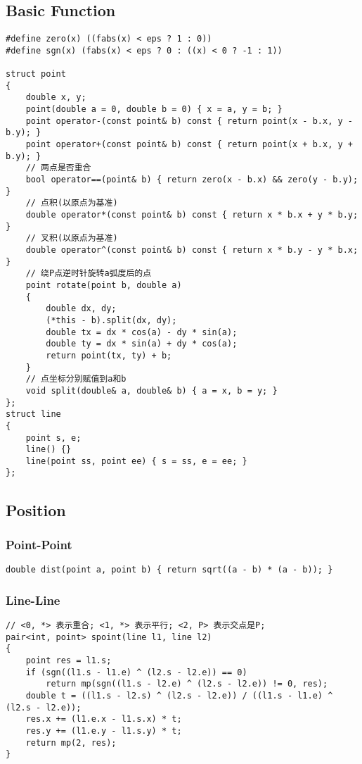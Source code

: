 \documentclass[twoside]{article}
\begin{document}
\subsection{Basic Function}
\begin{lstlisting}
#define zero(x) ((fabs(x) < eps ? 1 : 0))
#define sgn(x) (fabs(x) < eps ? 0 : ((x) < 0 ? -1 : 1))

struct point
{
    double x, y;
    point(double a = 0, double b = 0) { x = a, y = b; }
    point operator-(const point& b) const { return point(x - b.x, y - b.y); }
    point operator+(const point& b) const { return point(x + b.x, y + b.y); }
    // 两点是否重合
    bool operator==(point& b) { return zero(x - b.x) && zero(y - b.y); }
    // 点积(以原点为基准)
    double operator*(const point& b) const { return x * b.x + y * b.y; }
    // 叉积(以原点为基准)
    double operator^(const point& b) const { return x * b.y - y * b.x; }
    // 绕P点逆时针旋转a弧度后的点
    point rotate(point b, double a)
    {
        double dx, dy;
        (*this - b).split(dx, dy);
        double tx = dx * cos(a) - dy * sin(a);
        double ty = dx * sin(a) + dy * cos(a);
        return point(tx, ty) + b;
    }
    // 点坐标分别赋值到a和b
    void split(double& a, double& b) { a = x, b = y; }
};
struct line
{
    point s, e;
    line() {}
    line(point ss, point ee) { s = ss, e = ee; }
};
\end{lstlisting}
\subsection{Position}
\subsubsection{Point-Point}
\begin{lstlisting}
double dist(point a, point b) { return sqrt((a - b) * (a - b)); }
\end{lstlisting}
\subsubsection{Line-Line}
\begin{lstlisting}
// <0, *> 表示重合; <1, *> 表示平行; <2, P> 表示交点是P;
pair<int, point> spoint(line l1, line l2)
{
    point res = l1.s;
    if (sgn((l1.s - l1.e) ^ (l2.s - l2.e)) == 0)
        return mp(sgn((l1.s - l2.e) ^ (l2.s - l2.e)) != 0, res);
    double t = ((l1.s - l2.s) ^ (l2.s - l2.e)) / ((l1.s - l1.e) ^ (l2.s - l2.e));
    res.x += (l1.e.x - l1.s.x) * t;
    res.y += (l1.e.y - l1.s.y) * t;
    return mp(2, res);
}
\end{lstlisting}
\end{document}
